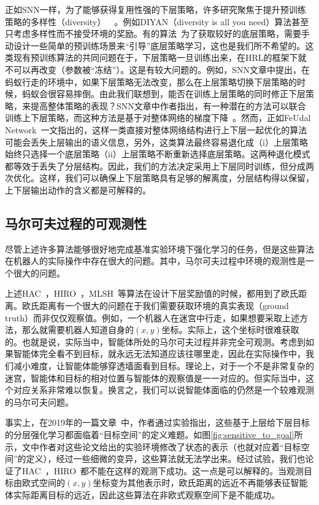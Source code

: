 正如SNN一样，为了能够获得复用性强的下层策略，许多研究聚焦于提升预训练策略的多样性（diversity）~\cite{DIYAN}~\cite{Learning_and_Transfer_of_Modulated_Locomotor_Controllers}。例如DIYAN（diversity is all you need）算法甚至只考虑多样性而不接受环境的奖励。有的算法~\cite{Learning_and_Transfer_of_Modulated_Locomotor_Controllers}为了获取较好的底层策略，需要手动设计一些简单的预训练场景来``引导''底层策略学习，这也是我们所不希望的。这类现有预训练算法的共同问题在于，下层策略一旦训练出来，在HRL的框架下就不可以再改变（参数被``冻结''）。这是有较大问题的。例如，SNN文章中提出，在蚂蚁行走的环境中，如果下层策略无法改变，那么在上层策略切换下层策略的时候，蚂蚁会很容易摔倒。由此我们联想到，能否在训练上层策略的同时修正下层策略，来提高整体策略的表现？SNN文章中作者指出，有一种潜在的方法可以联合训练上下层策略，而这种方法是基于对整体网络的梯度下降~\cite{categorical_gradient}。然而，正如FeUdal Network~\cite{feudal}一文指出的，这样一类直接对整体网络结构进行上下层一起优化的算法可能会丢失上层输出的语义信息，另外，这类算法最终容易退化成（i）上层策略始终只选择一个底层策略（ii）上层策略不断重新选择底层策略。这两种退化模式都等效于丢失了分层结构。因此，我们的方法决定采用上下层同时训练，但分成两次优化。这样，我们可以确保上下层策略具有足够的解离度，分层结构得以保留，上下层输出动作的含义都是可解释的。

\subsection{马尔可夫过程的可观测性}
尽管上述许多算法能够很好地完成基准实验环境下强化学习的任务，但是这些算法在机器人的实际操作中存在很大的问题。其中，马尔可夫过程中环境的观测性是一个很大的问题。

上述HAC~\cite{HAC}，HIRO~\cite{HIRO}，MLSH~\cite{MLSH}等算法在设计下层奖励值的时候，都用到了欧氏距离。欧氏距离有一个很大的问题在于我们需要获取环境的真实表现（ground truth）而非仅仅观察值。例如，一个机器人在迷宫中行走，如果想要采取上述方法，那么就需要机器人知道自身的$(x, y)$坐标。实际上，这个坐标时很难获取的。也就是说，实际当中，智能体所处的马尔可夫过程并非完全可观测。考虑到如果智能体完全看不到目标，就永远无法知道应该往哪里走，因此在实际操作中，我们减小难度，让智能体能够穿透墙面看到目标。理论上，对于一个不是非常复杂的迷宫，智能体和目标的相对位置与智能体的观察值是一一对应的。但实际当中，这个对应关系非常难以恢复。换言之，我们可以说智能体面临的仍然是一个较难观测的马尔可夫问题。

事实上，在2019年的一篇文章~\cite{sensitive_to_goal_space}中，作者通过实验指出，这些基于上层给下层目标的分层强化学习都面临着``目标空间''的定义难题。如图\ref{fig:sensitive_to_goal}所示，文中作者对这些论文给出的实验环境修改了状态的表示（也就对应着``目标空间''的定义），经过一些细微的变异，这些算法就无法学出来。经过试验，我们也论证了HAC~\cite{HAC}，HIRO~\cite{HIRO}都不能在这样的观测下成功。这一点是可以解释的。当观测目标由欧式空间的$(x, y)$坐标变为其他表示时，欧氏距离的远近不再能够表征智能体实际距离目标的远近，因此这些算法在非欧式观察空间下是不能成功。

